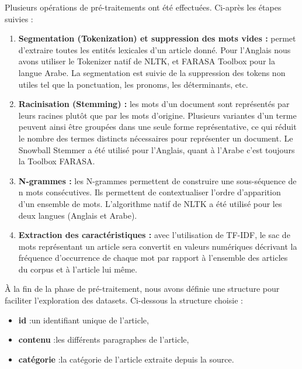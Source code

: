  Plusieurs opérations de pré-traitements ont été effectuées. Ci-après les étapes suivies :
\begin{enumerate}
    \item{\textbf{Segmentation (Tokenization) et suppression des mots vides :} }permet d'extraire toutes les entités lexicales d'un article donné. Pour l'Anglais nous avons utiliser le Tokenizer natif de NLTK, et FARASA Toolbox pour la langue Arabe. La segmentation est suivie de la suppression des tokens non utiles tel que la ponctuation, les pronoms, les déterminants, etc.\\  
    
    \item{\textbf{Racinisation (Stemming) :} }les mots d'un document sont représentés par leurs racines plutôt que par les mots d'origine. Plusieurs variantes d'un terme peuvent ainsi être groupées dans une seule forme représentative, ce qui réduit le nombre des termes distincts nécessaires pour représenter un document. Le Snowball Stemmer a été utilisé pour l'Anglais, quant à l'Arabe c'est toujours la Toolbox FARASA.\\
    
    \item{\textbf{N-grammes :} }les N-grammes permettent de construire une sous-séquence de n mots consécutives. Ils permettent de contextualiser l'ordre d'apparition d'un ensemble de mots. L'algorithme natif de NLTK a été utilisé pour les deux langues (Anglais et Arabe).\\ 
    
    \item{\textbf{Extraction des caractéristiques :} }avec l'utilisation de TF-IDF, le sac de mots représentant un article sera convertit en valeurs numériques décrivant la fréquence d'occurrence de chaque mot par rapport à l'ensemble des articles du corpus et à l'article lui même.\\
\end{enumerate}

À la fin de la phase de pré-traitement, nous avons définie une structure pour faciliter l'exploration des datasets. Ci-dessous la structure choisie :
\begin{itemize}
    \item{\textbf{id} :}un identifiant unique de l'article,
    \item{\textbf{contenu} :}les différents paragraphes de l'article,
    \item{\textbf{catégorie} :}la catégorie de l'article extraite depuis la source.
\end{itemize}


























